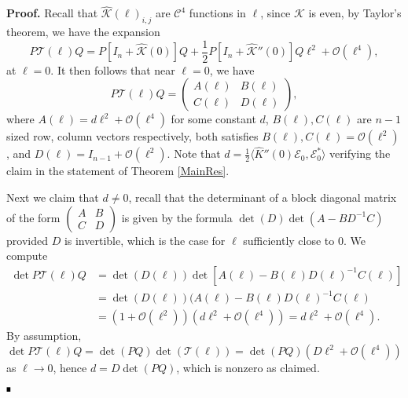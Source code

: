 \documentclass[letterpaper,11pt]{article}
\newcommand{\rmO}{\mathcal{O}}
\newcommand{\K}{\mathcal{K}}
\numberwithin{equation}{section}
\theoremstyle{plain}
\theoremstyle{remark}
\newenvironment{Proof}[1][.]%
 {\begin{trivlist}\item[]\textbf{Proof#1 }}%
 {\hspace*{\fill}$\rule{0.3\baselineskip}{0.35\baselineskip}$\end{trivlist}}
\begin{document}
\begin{Proof}
Recall that $\widehat{\K}(\ell)_{i,j}$ are $\mathscr{C}^4$ functions in $\ell$, since $\K$ is even, by Taylor's theorem, we have the expansion
\[
P\mathcal{T}(\ell)Q = P[I_n+\widehat{\K}(0)]Q+\frac{1}{2}P[I_n+\widehat{\K}''(0)]Q \ell^2 + \rmO(\ell^4) ,
\]
at $\ell =0 $. It then follows that near $\ell = 0$, we have
\[
P\mathcal{T}(\ell)Q = \begin{pmatrix}
A(\ell)& B(\ell)\\
C(\ell)& D(\ell) 
\end{pmatrix},
\]
where $A(\ell) = d\ell^2+\rmO(\ell^4)$ for some constant $d$, $B(\ell), C(\ell)$ are $n-1$ sized row, column vectors respectively, both satisfies $B(\ell),C(\ell) =\rmO(\ell^2)$, and $D(\ell) =I_{n-1}+\rmO(\ell^2)$. Note that $d = \frac{1}{2}\langle \widehat{K}''(0)\mathcal{E}_0,\mathcal{E}_0^*\rangle$ verifying the claim in the statement of Theorem \ref{MainRes}.

Next we claim that $d\neq 0$, recall that the determinant of a block diagonal matrix of the form $\begin{pmatrix}
A&B\\
C&D
\end{pmatrix}$ is given by the formula $\det(D)\det(A-BD^{-1}C)$ provided $D$ is invertible, which is the case for $\ell$ sufficiently close to $0$. We compute
\begin{align*}
\det P\mathcal{T}(\ell)Q &=\det (D(\ell))\det[A(\ell)-B(\ell)D(\ell)^{-1}C(\ell)] \\
& = \det(D(\ell)) (A(\ell)- B(\ell)D(\ell)^{-1}C(\ell)\\
& =(1+\rmO(\ell^2)) (d\ell^2 + \rmO(\ell^4)) = d\ell^2 +\rmO(\ell^4).
\end{align*}
By assumption, $\det P\mathcal{T}(\ell)Q = \det(PQ)\det(\mathcal{T}(\ell))=\det(PQ)(D\ell^2+\rmO(\ell^4))$ as $\ell \to 0$, hence $d = D\det(PQ)$, which is nonzero as claimed.



\end{Proof}
\end{document}
